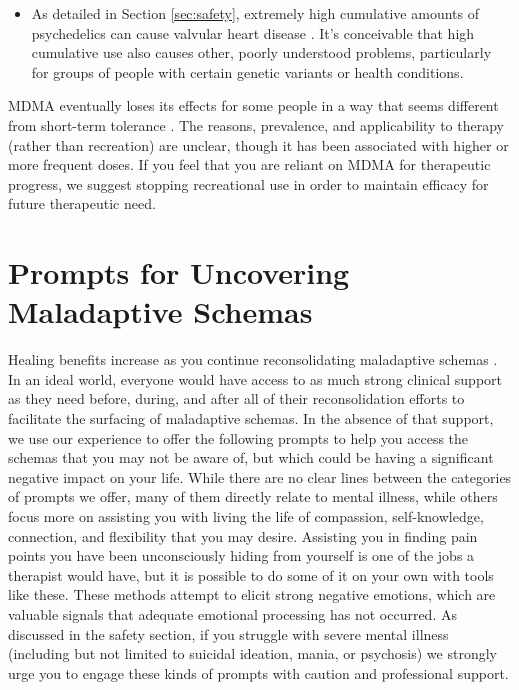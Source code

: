 \documentclass[12pt,letterpaper]{book}
\begin{document}
\begin{itemize}
    \item As detailed in Section \ref{sec:safety}, extremely high cumulative amounts of psychedelics can cause valvular heart disease \cite{droogmans2007valvular,tagen2023valvular}. It's conceivable that high cumulative use also causes other, poorly understood problems, particularly for groups of people with certain genetic variants or health conditions.
\end{itemize}

MDMA eventually loses its effects for some people in a way that seems different from short-term tolerance \cite{farreTolerance,parrottTolerance}. The reasons, prevalence, and applicability to therapy (rather than recreation) are unclear, though it has been associated with higher or more frequent doses. If you feel that you are reliant on MDMA for therapeutic progress, we suggest stopping recreational use in order to maintain efficacy for future therapeutic need.
\section{Prompts for Uncovering Maladaptive Schemas}
\label{uncovering}
Healing benefits increase as you continue reconsolidating maladaptive schemas \cite{eckerUnlocking}. In an ideal world, everyone would have access to as much strong clinical support as they need before, during, and after all of their reconsolidation efforts to facilitate the surfacing of maladaptive schemas. In the absence of that support, we use our experience to offer the following prompts to help you access the schemas that you may not be aware of, but which could be having a significant negative impact on your life. While there are no clear lines between the categories of prompts we offer, many of them directly relate to mental illness, while others focus more on assisting you with living the life of compassion, self-knowledge, connection, and flexibility that you may desire. Assisting you in finding pain points you have been unconsciously hiding from yourself is one of the jobs a therapist would have, but it is possible to do some of it on your own with tools like these. These methods attempt to elicit strong negative emotions, which are valuable signals that adequate emotional processing has not occurred. As discussed in the safety section, if you struggle with severe mental illness (including but not limited to suicidal ideation, mania, or psychosis) we strongly urge you to engage these kinds of prompts with caution and professional support.
\end{document}
